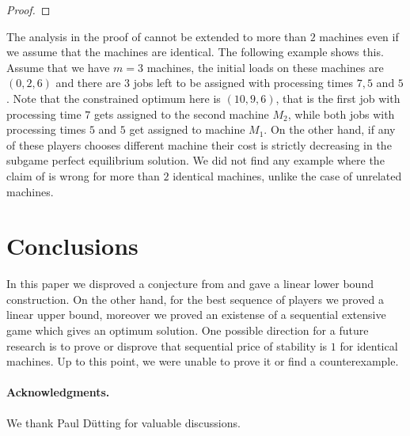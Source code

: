 \documentclass[runningheads]{llncs}
\renewcommand{\epsilon}{\varepsilon}
\begin{document}
\begin{proof}
%
\end{proof}

\begin{remark}
The analysis in the proof of  cannot be extended to more than $2$ machines even if we assume that the machines are identical. The following example shows this. Assume that we have $m=3$ machines, the initial loads on these machines are $(0,2,6)$ and there are $3$ jobs left to be assigned with processing times $7, 5$ and $5$. Note that the constrained optimum here is $(10, 9, 6)$, that is the first job with processing time $7$ gets assigned to the second machine $M_2$, while both jobs with processing times $5$ and $5$ get assigned to machine $M_1$. On the other hand, if any of these players chooses different machine their cost is strictly decreasing in the subgame perfect equilibrium solution. We did not find any example where the claim of  is wrong for more than $2$ identical machines, unlike the case of unrelated machines.      
\end{remark}




\section{Conclusions}\label{sec:conclusion}

In this paper we disproved a conjecture from \cite{Hassin} and gave a linear lower bound construction. On the other hand, for the best sequence of players we proved a linear upper bound, moreover we proved an existense of a sequential extensive game which gives an optimum solution. One possible direction for a future research is to prove or disprove that sequential price of stability is $1$ for identical machines. Up to this point, we were unable to prove it or find a counterexample. 


\paragraph{Acknowledgments.} We thank Paul D\"{u}tting for valuable discussions. 


% 


\end{document}
